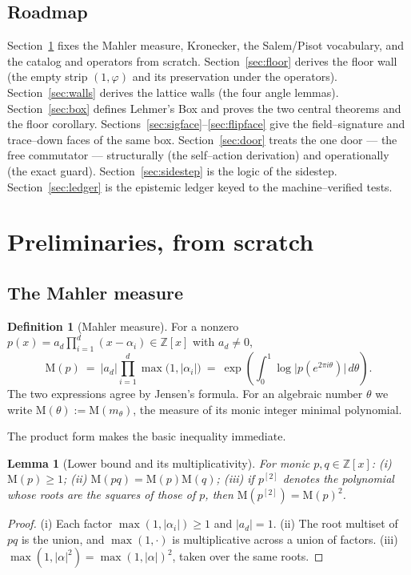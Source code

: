 \documentclass[11pt]{article}
\theoremstyle{plain}
\newtheorem{lemma}[theorem]{Lemma}
\theoremstyle{definition}
\newtheorem{definition}[theorem]{Definition}
\theoremstyle{remark}
\newcommand{\Z}{\mathbb{Z}}
\newcommand{\Mah}{\mathrm{M}}
\newcommand{\abs}[1]{\left\lvert #1 \right\rvert}
\begin{document}
\subsection{Roadmap}
Section~\ref{sec:prelim} fixes the Mahler measure, Kronecker, the Salem/Pisot vocabulary, and the catalog and operators from scratch. Section~\ref{sec:floor} derives the floor wall (the empty strip $(1,\varphi)$ and its preservation under the operators). Section~\ref{sec:walls} derives the lattice walls (the four angle lemmas). Section~\ref{sec:box} defines Lehmer's Box and proves the two central theorems and the floor corollary. Sections~\ref{sec:sigface}--\ref{sec:flipface} give the field--signature and trace--down faces of the same box. Section~\ref{sec:door} treats the one door --- the free commutator --- structurally (the self--action derivation) and operationally (the exact guard). Section~\ref{sec:sidestep} is the logic of the sidestep. Section~\ref{sec:ledger} is the epistemic ledger keyed to the machine--verified tests.

\section{Preliminaries, from scratch}\label{sec:prelim}

\subsection{The Mahler measure}\label{sec:mahler}
\begin{definition}[Mahler measure]\label{def:mahler}
For a nonzero $p(x)=a_d\prod_{i=1}^d(x-\alpha_i)\in\Z[x]$ with $a_d\neq0$,
\begin{equation}\label{eq:mahdef}
\Mah(p)\ =\ \abs{a_d}\prod_{i=1}^{d}\max\!\bigl(1,\abs{\alpha_i}\bigr)
\ =\ \exp\!\left(\int_0^1\log\bigl|p(e^{2\pi i\theta})\bigr|\,d\theta\right).
\end{equation}
The two expressions agree by Jensen's formula. For an algebraic number $\theta$ we write $\Mah(\theta):=\Mah(m_\theta)$, the measure of its monic integer minimal polynomial.
\end{definition}

The product form makes the basic inequality immediate.

\begin{lemma}[Lower bound and its multiplicativity]\label{lem:mahbasic}
For monic $p,q\in\Z[x]$: \emph{(i)} $\Mah(p)\ge1$; \emph{(ii)} $\Mah(pq)=\Mah(p)\Mah(q)$; \emph{(iii)} if $p^{[2]}$ denotes the polynomial whose roots are the squares of those of $p$, then $\Mah(p^{[2]})=\Mah(p)^2$.
\end{lemma}
\begin{proof}
(i) Each factor $\max(1,\abs{\alpha_i})\ge1$ and $\abs{a_d}=1$. (ii) The root multiset of $pq$ is the union, and $\max(1,\cdot)$ is multiplicative across a union of factors. (iii) $\max(1,\abs{\alpha}^2)=\max(1,\abs{\alpha})^2$, taken over the same roots.
\end{proof}
\end{document}
